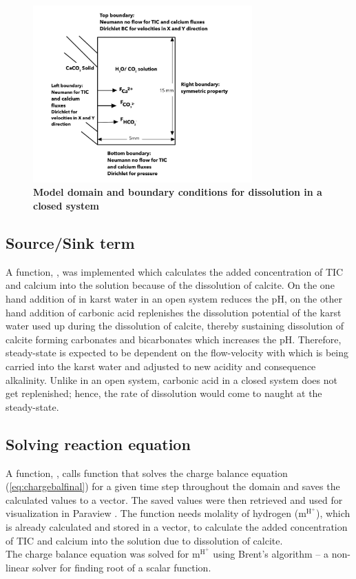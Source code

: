 \begin{figure}
    \centering
    \includegraphics[width=0.75\textwidth]{PICTURES/closed_system.jpg}
    \caption [Model domain and boundary conditions for  dissolution in a closed system] {\textbf{Model domain and boundary conditions for  dissolution in a closed system}}
    \label{fig:ClosedSystem}       %
\end{figure}
 

\subsection*{Source/Sink term} A function, , was implemented which calculates the added concentration of 
TIC and calcium into the solution because of the dissolution of calcite. On the one hand addition of  in karst water in an open system 
reduces the pH, on the other hand addition of carbonic acid replenishes the dissolution potential of the karst water used up  
during the dissolution of calcite, thereby sustaining dissolution of calcite forming carbonates and bicarbonates which increases the pH. 
Therefore, steady-state is expected to be dependent on the flow-velocity with which  is being carried into the karst water 
and adjusted to new acidity and consequence alkalinity. Unlike in an open system, carbonic acid in a closed system does not get 
replenished; hence, the rate of dissolution would come to naught at the steady-state. 


\subsection*{Solving reaction equation} A function, , calls  function that solves the charge 
balance equation (\ref{eq:chargebalfinal}) for a given time step throughout the domain and saves the calculated values to a vector. 
The saved values were then retrieved and used for visualization in Paraview \cite{ahrens2005paraview}. The function  needs molality of 
hydrogen ($\mathrm{m^{H^+}}$), which is already calculated and stored in a vector, to calculate the added concentration of TIC 
and calcium into the solution due to dissolution of calcite. \\
The charge balance equation was solved for $\mathrm{m^{H^+}}$ using Brent's algorithm \cite{brent1971algorithm} -- a non-linear solver 
for finding root of a scalar function. 


